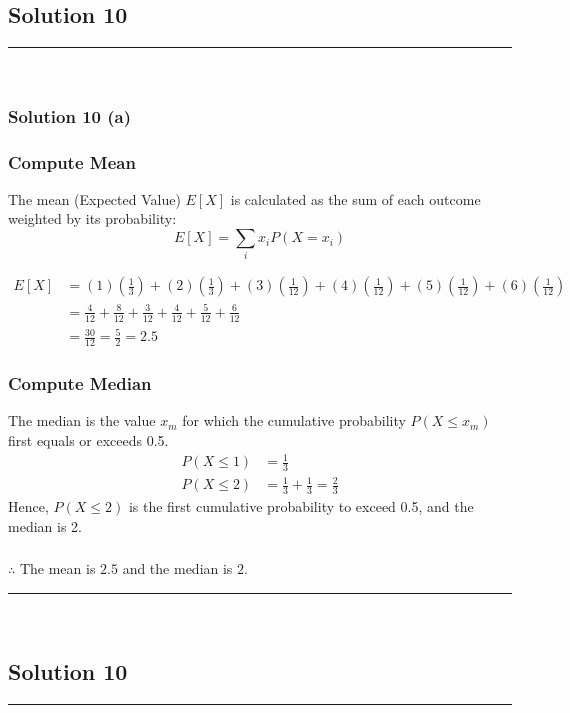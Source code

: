 \documentclass{article}
\begin{document}
\subsection*{Solution 10}
\noindent\rule{\textwidth}{0.4pt}\\
\subsubsection*{Solution  10 (a)}

\subsubsection*{Compute Mean}
\parbox{\textwidth}{The mean (Expected Value) $E[X]$ is calculated as the sum of each outcome weighted by its probability: 
$$E[X] = \sum_{i} x_i P(X=x_i)$$ }
\begin{align*}
E[X] &= (1)\left(\frac{1}{3}\right) + (2)\left(\frac{1}{3}\right) + (3)\left(\frac{1}{12}\right) + (4)\left(\frac{1}{12}\right) + (5)\left(\frac{1}{12}\right) + (6)\left(\frac{1}{12}\right) \\
&= \frac{4}{12} + \frac{8}{12} + \frac{3}{12} + \frac{4}{12} + \frac{5}{12} + \frac{6}{12} \\
&= \frac{30}{12} = \frac{5}{2} = 2.5
\end{align*}
\subsubsection*{Compute Median}
\parbox{\textwidth}{The median is the value $x_m$ for which the cumulative probability $P(X \le x_m)$ first equals or exceeds 0.5.
\begin{align*}
P(X \le 1) &= \frac{1}{3} \\
P(X \le 2) &= \frac{1}{3} + \frac{1}{3} = \frac{2}{3} 
\end{align*}
Hence, $P(X \le 2)$ is the first cumulative probability to exceed 0.5, and the median is 2.}
\subsubsection*{\normalfont}{$\therefore$ The mean is $2.5$ and the median is $2$.}

\noindent\rule{\textwidth}{0.4pt}\\

\newpage
\subsection*{Solution 10}
\noindent\rule{\textwidth}{0.4pt}\\
\end{document}

